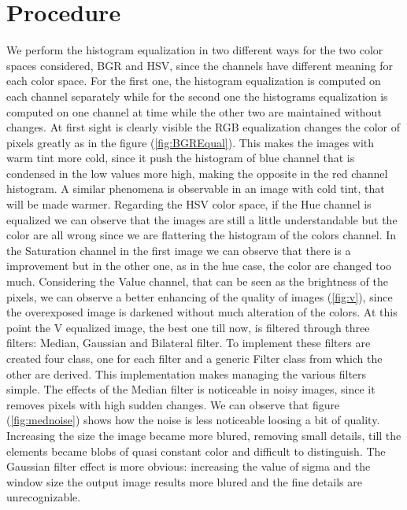 \documentclass[11pt,a4paper]{article}
\newcommand{\cc}{\fontfamily{txtt}\selectfont}
\begin{document}
\section{Procedure}
We perform the histogram equalization in two different ways for the two color spaces considered, BGR and HSV, since the channels have different meaning for each color space.
For the first one, the histogram equalization is computed on each channel separately while for the second one the histograms equalization is computed on one channel at time while the other two are maintained without changes.
At first sight is clearly visible the RGB equalization changes the color of pixels greatly as in the figure (\ref{fig:BGREqual}).
This makes the images with warm tint more cold, since it push the histogram of blue channel that is condensed in the low values more high, making the opposite in the red channel histogram.
A similar phenomena is observable in an image with cold tint, that will be made warmer.\newline
Regarding the HSV color space, if the Hue channel is equalized we can observe that the images are still a little understandable but the color are all wrong since we are flattering the histogram of the colors channel.
In the Saturation channel in the first image we can observe that there is a improvement but in the other one, as in the hue case, the color are changed too much.
Considering the Value channel, that can be seen as the brightness of the pixels, we can observe a better enhancing of the quality of images (\ref{fig:v}), since the overexposed image is darkened without much alteration of the colors.\newline
At this point the V equalized image, the best one till now, is filtered through three filters: Median, Gaussian and Bilateral filter.
To implement these filters are created four class, one for each filter and a generic {\cc Filter} class from which the other are derived.
This implementation makes managing the various filters simple.
The effects of the Median filter is noticeable in noisy images, since it removes pixels with high sudden changes.
We can observe that figure (\ref{fig:mednoise}) shows how the noise is less noticeable loosing a bit of quality.
Increasing the size the image became more blured, removing small details, till the elements became blobs of quasi constant color and difficult to distinguish.\newline
The Gaussian filter effect is more obvious: increasing the value of sigma and the window size the output image results more blured and the fine details are unrecognizable.
\end{document}
